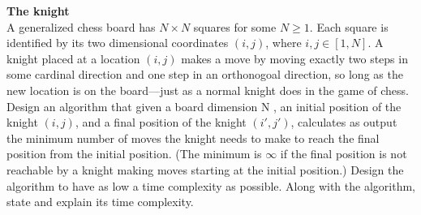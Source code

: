 \textbf{The knight} \\
A generalized chess board has $N \times N$ squares for some $N \geq 1$. Each square is identified by its two
dimensional coordinates $(i, j)$, where $i, j \in [1, N ]$. A knight placed at a location $(i, j)$ makes a move by
moving exactly two steps in some cardinal direction and one step in an orthonogoal direction, so long
as the new location is on the board—just as a normal knight does in the game of chess. Design an
algorithm that given a board dimension N , an initial position of the knight $(i, j)$, and a final position
of the knight $(i', j')$, calculates as output the minimum number of moves the knight needs to make
to reach the final position from the initial position. (The minimum is $\infty$ if the final position is not
reachable by a knight making moves starting at the initial position.)
Design the algorithm to have as low a time complexity as possible. Along with the algorithm, state
and explain its time complexity.
